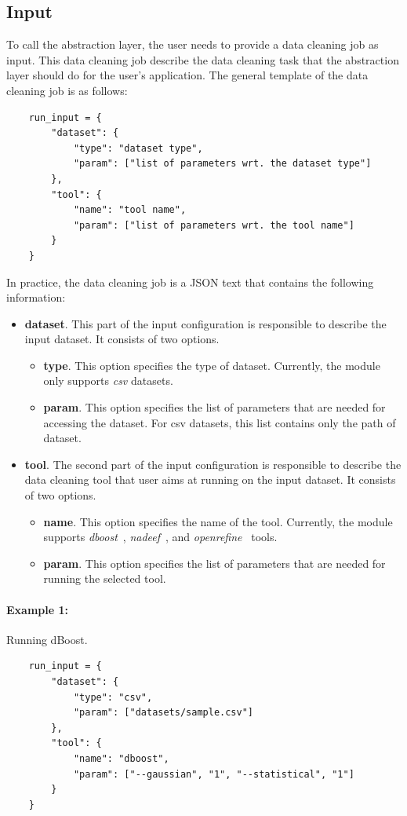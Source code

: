 \documentclass[12pt]{article}
\begin{document}
\subsection{Input}
To call the abstraction layer, the user needs to provide a data cleaning job as input. This data cleaning job describe the data cleaning task that the abstraction layer should do for the user's application. The general template of the data cleaning job is as follows:
\begin{lstlisting}
	run_input = {
		"dataset": {
			"type": "dataset type",
			"param": ["list of parameters wrt. the dataset type"]
		},
		"tool": {
			"name": "tool name",
			"param": ["list of parameters wrt. the tool name"]
		}
	}
\end{lstlisting}
In practice, the data cleaning job is a JSON text that contains the following information: 
\begin{itemize}
	\item \textbf{dataset}. This part of the input configuration is responsible to describe the input dataset. It consists of two options.
	\begin{itemize}
		\item \textbf{type}. This option specifies the type of dataset. Currently, the module only supports \emph{csv} datasets.
		\item \textbf{param}. This option specifies the list of parameters that are needed for accessing the dataset. For csv datasets, this list contains only the path of dataset.
	\end{itemize}
	\item \textbf{tool}. The second part of the input configuration is responsible to describe the data cleaning tool that user aims at running on the input dataset. It consists of two options.
	\begin{itemize}
		\item\textbf{name}. This option specifies the name of the tool. Currently, the module supports \emph{dboost}~\cite{mariet2016outlier}, \emph{nadeef}~\cite{dallachiesa2013nadeef}, and \emph{openrefine}~\cite{verborgh2013using} tools.
		\item \textbf{param}. This option specifies the list of parameters that are needed for running the selected tool.		
	\end{itemize}

\end{itemize}

\paragraph{Example 1:} Running dBoost.
\begin{lstlisting}
	run_input = {
		"dataset": {
			"type": "csv",
			"param": ["datasets/sample.csv"]
		},
		"tool": {
			"name": "dboost",
			"param": ["--gaussian", "1", "--statistical", "1"]
		}
	}
\end{lstlisting}
\end{document}
